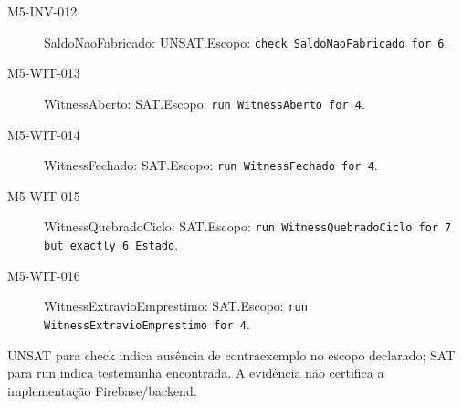 \begin{description}
\item[M5-INV-012] SaldoNaoFabricado: UNSAT.\newline Escopo: \texttt{check SaldoNaoFabricado for 6}.
\item[M5-WIT-013] WitnessAberto: SAT.\newline Escopo: \texttt{run WitnessAberto for 4}.
\item[M5-WIT-014] WitnessFechado: SAT.\newline Escopo: \texttt{run WitnessFechado for 4}.
\item[M5-WIT-015] WitnessQuebradoCiclo: SAT.\newline Escopo: \texttt{run WitnessQuebradoCiclo for 7 but exactly 6 Estado}.
\item[M5-WIT-016] WitnessExtravioEmprestimo: SAT.\newline Escopo: \texttt{run WitnessExtravioEmprestimo for 4}.
\end{description}
UNSAT para check indica ausência de contraexemplo no escopo declarado; SAT para run indica testemunha encontrada. A evidência não certifica a implementação Firebase/backend.
